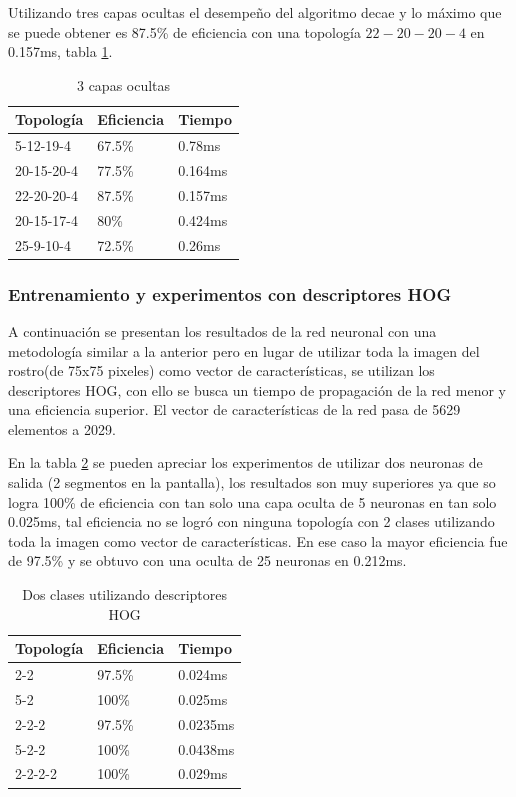 Utilizando tres capas ocultas el desempeño del algoritmo decae y lo máximo que se puede obtener es 87.5\% de eficiencia con una topología $22-20-20-4$ en 0.157ms, tabla \ref{tab:tresCapa4}.
\begin{table}[]
	\centering
	\caption{3 capas ocultas}
	\label{my-label}
	\begin{tabular}{|l|l|l|}
		\hline
		Topología  & Eficiencia & Tiempo  \\ \hline
		5-12-19-4  & 67.5\%     & 0.78ms  \\ \hline
		20-15-20-4 & 77.5\%     & 0.164ms \\ \hline
		22-20-20-4 & 87.5\%     & 0.157ms \\ \hline
		20-15-17-4 & 80\%       & 0.424ms \\ \hline
		25-9-10-4  & 72.5\%     & 0.26ms  \\ \hline
	\end{tabular} \label{tab:tresCapa4}
\end{table}

\subsubsection{Entrenamiento y experimentos con descriptores HOG}
A continuación se presentan los resultados de la red neuronal con una metodología similar a la anterior pero en lugar de utilizar toda la imagen del rostro(de 75x75 pixeles) como vector de características, se utilizan los descriptores HOG, con ello se busca un tiempo de propagación de la red menor y una eficiencia superior. El vector de características de la red pasa de 5629 elementos a 2029.

En la tabla \ref{Hog2Clases} se pueden apreciar los experimentos de utilizar dos neuronas de salida (2 segmentos en la pantalla), los resultados son muy superiores ya que so logra 100\% de eficiencia con tan solo una capa oculta de 5 neuronas en tan solo 0.025ms, tal eficiencia no se logró con ninguna topología con 2 clases utilizando toda la imagen como vector de características. En ese caso la mayor eficiencia fue de 97.5\% y se obtuvo con una oculta de 25 neuronas en 0.212ms.
\begin{table}[]
	\centering
	\caption{Dos clases utilizando descriptores HOG}
	\label{my-label}
	\begin{tabular}{|l|l|l|}
		\hline
		Topología & Eficiencia & Tiempo   \\ \hline
		2-2       & 97.5\%     & 0.024ms  \\ \hline
		5-2       & 100\%      & 0.025ms  \\ \hline
		2-2-2     & 97.5\%     & 0.0235ms \\ \hline
		5-2-2     & 100\%      & 0.0438ms \\ \hline
		2-2-2-2   & 100\%      & 0.029ms  \\ \hline
	\end{tabular}\label{Hog2Clases}
\end{table}

